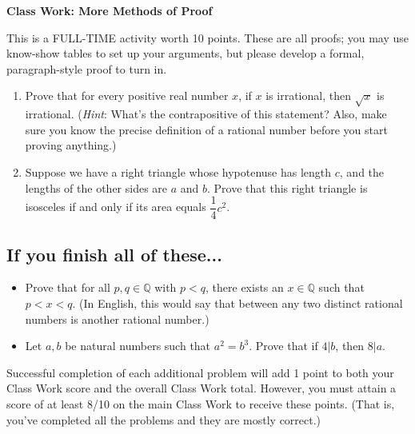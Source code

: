 \documentclass[11pt]{article}
\begin{document}
	
	\thispagestyle{empty}
	\renewcommand{\headrulewidth}{0.0pt}
	\thispagestyle{fancy}
	\lfoot{}
	\cfoot{}
	\rfoot{}	
	
	\vspace*{0in}

		\begin{center}
			\begin{large}
			\textbf{Class Work: More Methods of Proof} \\
			\end{large}
		\end{center}
		
This is a FULL-TIME activity worth 10 points. These are all proofs; you may use know-show tables to set up your arguments, but please develop a formal, paragraph-style proof to turn in. 

\begin{enumerate}

\item Prove that for every positive real number $x$, if $x$ is irrational, then $\sqrt{x}$ is irrational. (\emph{Hint}: What's the contrapositive of this statement? Also, make sure you know the precise definition of a rational number before you start proving anything.) 

\item Suppose we have a right triangle whose hypotenuse has length $c$, and the lengths of the other sides are $a$ and $b$. Prove that this right triangle is isosceles if and only if its area equals $\dfrac{1}{4}c^2$. 
	
	
\end{enumerate}	
	
\subsection*{If you finish all of these...}

\begin{itemize}
	\item Prove that for all $p,q \in \mathbb{Q}$ with $p < q$, there exists an $x \in \mathbb{Q}$ such that $p < x < q$. (In English, this would say that between any two distinct rational numbers is another rational number.) 
	\item Let $a,b$ be natural numbers such that $a^2 = b^3$. Prove that if $4 | b$, then $8 | a$. 
\end{itemize}

Successful completion of each additional problem will add 1 point to both your Class Work score and the overall Class Work total. However, you must attain a score of at least 8/10 on the main Class Work to receive these points. (That is, you've completed all the problems and they are mostly correct.) 	
	
\end{document}
